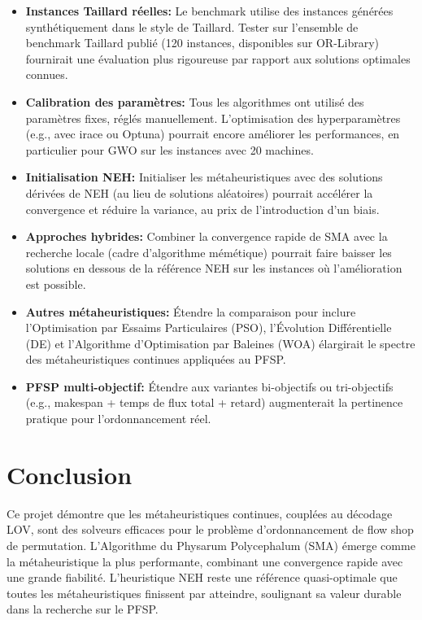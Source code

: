 \documentclass[12pt,a4paper,oneside]{report}
\begin{document}
\begin{itemize}[itemsep=4pt]
    \item \textbf{Instances Taillard r\'eelles:} Le benchmark utilise des instances g\'en\'er\'ees synth\'etiquement dans le style de Taillard. Tester sur l'ensemble de benchmark Taillard publi\'e (120 instances, disponibles sur OR-Library) fournirait une \'evaluation plus rigoureuse par rapport aux solutions optimales connues.
    
    \item \textbf{Calibration des param\`etres:} Tous les algorithmes ont utilis\'e des param\`etres fixes, r\'egl\'es manuellement. L'optimisation des hyperparam\`etres (e.g., avec irace ou Optuna) pourrait encore am\'eliorer les performances, en particulier pour GWO sur les instances avec 20 machines.
    
    \item \textbf{Initialisation NEH:} Initialiser les m\'etaheuristiques avec des solutions d\'eriv\'ees de NEH (au lieu de solutions al\'eatoires) pourrait acc\'el\'erer la convergence et r\'eduire la variance, au prix de l'introduction d'un biais.
    
    \item \textbf{Approches hybrides:} Combiner la convergence rapide de SMA avec la recherche locale (cadre d'algorithme m\'em\'etique) pourrait faire baisser les solutions en dessous de la r\'ef\'erence NEH sur les instances o\`u l'am\'elioration est possible.
    
    \item \textbf{Autres m\'etaheuristiques:} \'Etendre la comparaison pour inclure l'Optimisation par Essaims Particulaires (PSO), l'\'Evolution Diff\'erentielle (DE) et l'Algorithme d'Optimisation par Baleines (WOA) \'elargirait le spectre des m\'etaheuristiques continues appliqu\'ees au PFSP.
    
    \item \textbf{PFSP multi-objectif:} \'Etendre aux variantes bi-objectifs ou tri-objectifs (e.g., makespan + temps de flux total + retard) augmenterait la pertinence pratique pour l'ordonnancement r\'eel.
\end{itemize}

\section{Conclusion}

Ce projet d\'emontre que les m\'etaheuristiques continues, coupl\'ees au d\'ecodage LOV, sont des solveurs efficaces pour le probl\`eme d'ordonnancement de flow shop de permutation. L'Algorithme du Physarum Polycephalum (SMA) \'emerge comme la m\'etaheuristique la plus performante, combinant une convergence rapide avec une grande fiabilit\'e. L'heuristique NEH reste une r\'ef\'erence quasi-optimale que toutes les m\'etaheuristiques finissent par atteindre, soulignant sa valeur durable dans la recherche sur le PFSP.
\end{document}
